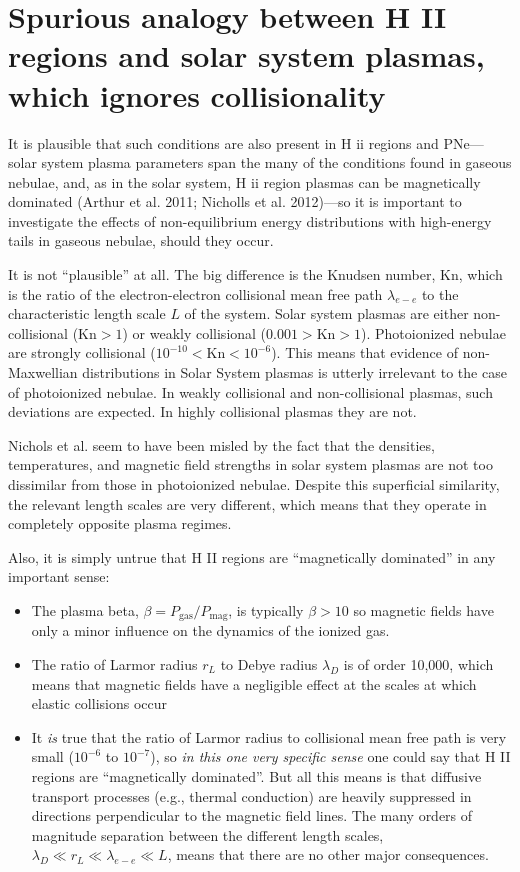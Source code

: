 \documentclass[11pt]{article}
\renewenvironment{quote}{\begin{shaded*}\small\sffamily}{\end{shaded*}}
\begin{document}
\section*{Spurious analogy between H II regions and solar system plasmas, which ignores collisionality}
\label{sec:orgheadline3}
\begin{quote}
It is plausible that such conditions are also present in H ii regions and PNe—solar system plasma parameters span the many of the conditions found in gaseous nebulae, and, as in the solar system, H ii region plasmas can be magnetically dominated (Arthur et al. 2011; Nicholls et al. 2012)—so it is important to investigate the effects of non-equilibrium energy distributions with high-energy tails in gaseous nebulae, should they occur.
\end{quote}

It is not ``plausible'' at all.  The big difference is the Knudsen number, \(\mathrm{Kn}\), which is the ratio of the electron-electron collisional mean free path \(\lambda_{e-e}\) to the characteristic length scale \(L\) of the system.  Solar system plasmas are either non-collisional (\(\mathrm{Kn} > 1\)) or weakly collisional (\(0.001 > \mathrm{Kn} > 1\)).  Photoionized nebulae are strongly collisional (\(10^{-10} < \mathrm{Kn} < 10^{-6}\)).  This means that evidence of non-Maxwellian distributions in Solar System plasmas is utterly irrelevant to the case of photoionized nebulae.  In weakly collisional and non-collisional plasmas, such deviations are expected.  In highly collisional plasmas they are not. 

Nichols et al. seem to have been misled by the fact that the densities, temperatures, and magnetic field strengths in solar system plasmas are not too dissimilar from those in photoionized nebulae.  Despite this superficial similarity, the relevant length scales are very different, which means that they operate in completely opposite plasma regimes.

Also, it is simply untrue that H II regions are ``magnetically dominated'' in any important sense:
\begin{itemize}
\item The plasma beta, \(\beta = P_{\mathrm{gas}} / P_{\mathrm{mag}}\), is typically \(\beta > 10\) so magnetic fields have only a minor influence on the dynamics of the ionized gas.
\item The ratio of Larmor radius \(r_{L}\) to Debye radius \(\lambda_{D}\) is of order 10,000, which means that magnetic fields have a negligible effect at the scales at which elastic collisions occur
\item It \emph{is} true that the ratio of Larmor radius to collisional mean free path is very small (\(10^{-6}\) to \(10^{{-7}}\)), so \emph{in this one very specific sense} one could say that H II regions are ``magnetically dominated''.  But all this means is that diffusive transport processes (e.g., thermal conduction) are heavily suppressed in directions perpendicular to the magnetic field lines.   The many orders of magnitude separation between the different length scales, \(\lambda_{D} \ll r_{L} \ll \lambda_{e-e} \ll L\), means that there are no other major consequences.
\end{itemize}
\end{document}
